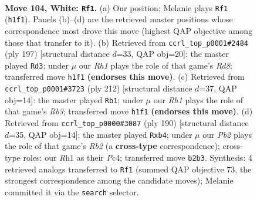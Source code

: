 \documentclass[11pt]{article}
\begin{document}
\clearpage

\begin{figure}[p]\centering
\begin{subfigure}{0.46\textwidth}\centering
\resizebox{\linewidth}{!}{%
\newchessgame
\chessboard[
  setfen={6r1/2k5/p7/P1p2p1p/1p3P1P/4P1PK/1P6/7R w - - 19 104},
  showmover=false,
  pgfstyle=straightmove, color=movearrow, markmove={h1-f1}
]}
\caption{}
\end{subfigure}\hfill
\begin{subfigure}{0.46\textwidth}\centering
\resizebox{\linewidth}{!}{%
\newchessgame
\chessboard[
  setfen={8/1R3pk1/4p1p1/6Pp/4P2P/5P1K/8/3r4 b - - 86 99},
  showmover=false,
  pgfstyle=straightmove, color=movearrow, markmove={d1-d3}
]}
\caption{}
\end{subfigure}
\\[4pt]
\begin{subfigure}{0.46\textwidth}\centering
\resizebox{\linewidth}{!}{%
\newchessgame
\chessboard[
  setfen={8/5p2/4p2k/4Pp1p/5P1P/1R4PK/4r3/8 w - - 97 107},
  showmover=false,
  pgfstyle=straightmove, color=movearrow, markmove={b3-b1}
]}
\caption{}
\end{subfigure}\hfill
\begin{subfigure}{0.46\textwidth}\centering
\resizebox{\linewidth}{!}{%
\newchessgame
\chessboard[
  setfen={4k3/4p3/p2pP1r1/P4p1p/1pP4P/4KPP1/1R6/8 w - - 1 96},
  showmover=false,
  pgfstyle=straightmove, color=movearrow, markmove={b2-b4}
]}
\caption{}
\end{subfigure}
\caption{\textbf{Move 104, White: \texttt{Rf1}.} (a) Our position; Melanie plays \texttt{Rf1} (\texttt{h1f1}). Panels (b)--(d) are the retrieved master positions whose correspondence most drove this move (highest QAP objective among those that transfer to it). (b) Retrieved from \texttt{ccrl\_top\_p0001\#2484} (ply 197) [structural distance $d$=33, QAP obj=20]: the master played \texttt{Rd3}; under $\mu$ our \emph{Rh1} plays the role of that game's \emph{Rd8}; transferred move \texttt{h1f1} \textbf{(endorses this move)}. (c) Retrieved from \texttt{ccrl\_top\_p0001\#3723} (ply 212) [structural distance $d$=37, QAP obj=14]: the master played \texttt{Rb1}; under $\mu$ our \emph{Rh1} plays the role of that game's \emph{Rb3}; transferred move \texttt{h1f1} \textbf{(endorses this move)}. (d) Retrieved from \texttt{ccrl\_top\_p0000\#3087} (ply 190) [structural distance $d$=35, QAP obj=14]: the master played \texttt{Rxb4}; under $\mu$ our \emph{Pb2} plays the role of that game's \emph{Rb2} (a \textbf{cross-type} correspondence); cross-type roles: our \emph{R}h1 as their \emph{P}c4; transferred move \texttt{b2b3}. Synthesis: 4 retrieved analogs transferred to \texttt{Rf1} (summed QAP objective 73, the strongest correspondence among the candidate moves); Melanie committed it via the \texttt{search} selector.}
\label{fig:thought-m206}
\end{figure}
\end{document}
